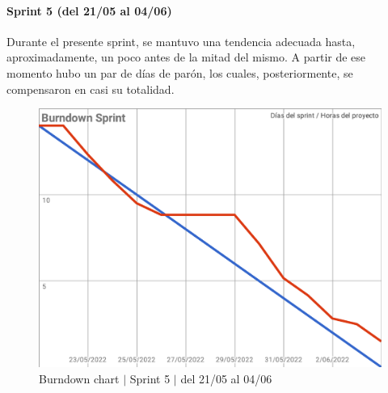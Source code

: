 \paragraph{Sprint 5 (del 21/05 al 04/06)}
Durante el presente sprint, se mantuvo una tendencia adecuada hasta, aproximadamente, un poco antes de la mitad del mismo. A partir de ese momento hubo un par de días de parón, los cuales, posteriormente, se compensaron en casi su totalidad.
\begin{figure}[H]
    \centering
    \includegraphics[width=1\linewidth]{text/image/BurndownChart5.pdf}
    \caption{Burndown chart $|$ Sprint 5 $|$ del 21/05 al 04/06}
    \label{fig:burndown_chart_5}
\end{figure}

\newpage
